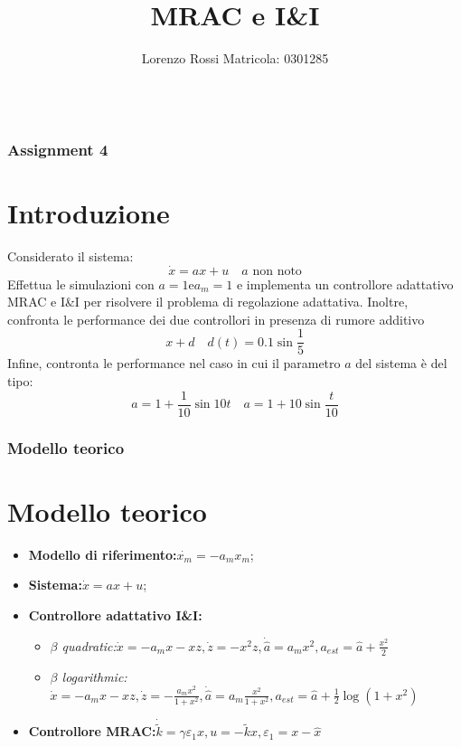 \documentclass{beamer}
\title[Assignments 4]{MRAC e I\&I}
\author{Lorenzo Rossi Matricola: 0301285}
\begin{document}
\begin{frame}
	\titlepage{}
\end{frame}
\begin{frame}
	\begin{columns}[t]
		\begin{column}{.5\textwidth}
			\tableofcontents[sections={1-3}] %
		\end{column}
		\hspace{-1cm}
		\begin{column}{.5\textwidth}
			\tableofcontents[sections={4-5}] %
		\end{column}
	\end{columns}
\end{frame}
\begin{frame}
	\frametitle{Assignment 4}
	\section{Introduzione}
	Considerato il sistema:\begin{equation*}
		\dot{x}=ax+u\quad a\text{ non noto}
	\end{equation*}
	Effettua le simulazioni con \(a=1 \text{e} a_{m}=1\) e implementa un controllore adattativo MRAC e I\&I per risolvere il problema di regolazione adattativa. Inoltre, confronta le performance dei due controllori in presenza di rumore additivo \begin{equation*}
		x+d\quad d(t) = 0.1 \sin{\frac{1}{5}}
	\end{equation*}
	Infine, contronta le performance nel caso in cui il parametro \(a\) del sistema è del tipo:
	\begin{equation*}
		a=1+\frac{1}{10}\sin{10t}\quad a=1+10\sin{\frac{t}{10}}
	\end{equation*}
\end{frame}
\begin{frame}
	\frametitle{Modello teorico}
	\section{Modello teorico}
	\begin{itemize}
		\item \textbf{Modello di riferimento:}\(\dot{x_{m}}=-a_{m}x_{m}\);
		\item \textbf{Sistema:}\(\dot{x}=ax+u\);
		\item \textbf{Controllore adattativo I\&I:}\begin{itemize}
			      \item \emph{\(\beta\) quadratic:}\(\dot{x}=-a_{m}x-xz,\dot{z}=-x^{2}z,\dot{\hat{a}}=a_{m}x^{2},a_{est}=\hat{a}+\frac{x^{2}}{2}\)
			      \item \emph{\(\beta\) logarithmic:}\(\dot{x}=-a_{m}x-xz,\dot{z}=-\frac{a_{m}x^{2}}{1+x^{2}},\dot{\hat{a}}=a_{m}\frac{x^{2}}{1+x^{2}},a_{est}=\hat{a}+\frac{1}{2}\log{(1+x^{2})}\)
		      \end{itemize}
		\item \textbf{Controllore MRAC:}\(\dot{\tilde{k}}=\gamma \varepsilon_{1}x,u=-\tilde{k}x,\varepsilon_{1}=x-\hat{x}\)
	\end{itemize}
\end{frame}
\end{document}

